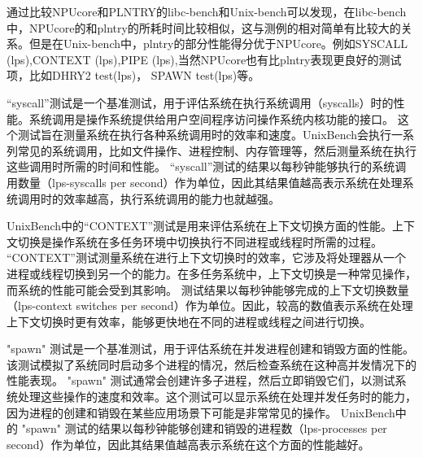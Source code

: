 通过比较NPUcore和PLNTRY的libc-bench和Unix-bench可以发现，在libc-bench中，NPUcore的和plntry的所耗时间比较相似，这与测例的相对简单有比较大的关系。但是在Unix-bench中，plntry的部分性能得分优于NPUcore。例如SYSCALL (lps),CONTEXT (lps),PIPE (lps),当然NPUcore也有比plntry表现更良好的测试项，比如DHRY2 test(lps)， SPAWN test(lps)等。

“syscall”测试是一个基准测试，用于评估系统在执行系统调用（syscalls）时的性能。系统调用是操作系统提供给用户空间程序访问操作系统内核功能的接口。
这个测试旨在测量系统在执行各种系统调用时的效率和速度。UnixBench会执行一系列常见的系统调用，比如文件操作、进程控制、内存管理等，然后测量系统在执行这些调用时所需的时间和性能。
“syscall”测试的结果以每秒钟能够执行的系统调用数量（lps-syscalls per second）作为单位，因此其结果值越高表示系统在处理系统调用时的效率越高，执行系统调用的能力也就越强。

UnixBench中的“CONTEXT”测试是用来评估系统在上下文切换方面的性能。上下文切换是操作系统在多任务环境中切换执行不同进程或线程时所需的过程。
“CONTEXT”测试测量系统在进行上下文切换时的效率，它涉及将处理器从一个进程或线程切换到另一个的能力。在多任务系统中，上下文切换是一种常见操作，而系统的性能可能会受到其影响。
测试结果以每秒钟能够完成的上下文切换数量（lps-context switches per second）作为单位。因此，较高的数值表示系统在处理上下文切换时更有效率，能够更快地在不同的进程或线程之间进行切换。

"spawn" 测试是一个基准测试，用于评估系统在并发进程创建和销毁方面的性能。该测试模拟了系统同时启动多个进程的情况，然后检查系统在这种高并发情况下的性能表现。
"spawn" 测试通常会创建许多子进程，然后立即销毁它们，以测试系统处理这些操作的速度和效率。这个测试可以显示系统在处理并发任务时的能力，因为进程的创建和销毁在某些应用场景下可能是非常常见的操作。
UnixBench中的 "spawn" 测试的结果以每秒钟能够创建和销毁的进程数（lps-processes per second）作为单位，因此其结果值越高表示系统在这个方面的性能越好。


